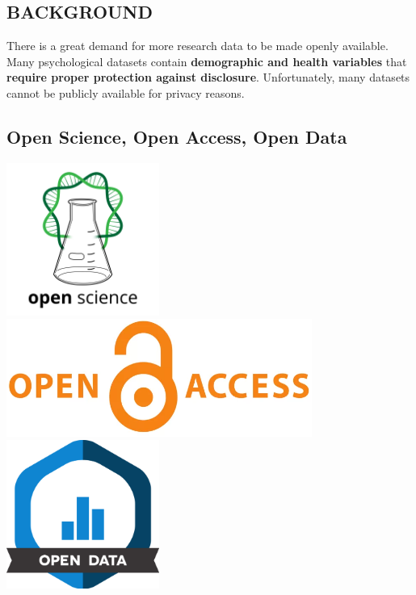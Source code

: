 \documentclass[a0,portrait]{a0poster}
\begin{document}
\begin{multicols}{3} %

\Large
\section{BACKGROUND}

There is a great demand for more research data to be made openly available.
Many psychological datasets contain \textbf{demographic and health variables} that \textbf{require proper protection against disclosure}.
Unfortunately, many datasets cannot be publicly available for privacy reasons.

\subsection{Open Science, Open Access, Open Data}

 \includegraphics[width=5cm]{Poster TEX/style/Open Science.png} 
 \hspace{\fill} 
 \includegraphics[width=10cm]{Poster TEX/style/Open access (4).png}
 \hspace{\fill} 
 \includegraphics[width=5cm]{Poster TEX/style/Open data.png}


\end{multicols}
\end{document}
